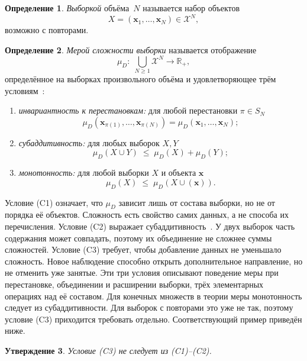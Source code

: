 \documentclass[14pt, a4paper]{extarticle}
\theoremstyle{definition}
\newtheorem{definition}{Определение}[section]
\theoremstyle{plain}
\newtheorem{proposition}[definition]{Утверждение}
\begin{document}
\begin{definition}
\label{def:sample}
\emph{Выборкой} объёма~$N$ называется набор объектов
\[
    X = (\mathbf{x}_1, \dots, \mathbf{x}_N) \in \mathcal{X}^N,
\]
возможно с повторами.
\end{definition}


\begin{definition}
\label{def:complexity}
\emph{Мерой сложности выборки} называется отображение
\[
    \mu_D:\; \bigcup_{N\ge1}\mathcal{X}^N \to \mathbb{R}_+,
\]
определённое на выборках произвольного объёма и удовлетворяющее трём
условиям~\cite{Grabovoy2025Thesis}:
\begin{enumerate}
    \item[(C1)] \emph{инвариантность к перестановкам:} для любой перестановки
          $\pi \in S_N$
          \[
              \mu_D(\mathbf{x}_{\pi(1)}, \dots, \mathbf{x}_{\pi(N)})
              = \mu_D(\mathbf{x}_1, \dots, \mathbf{x}_N);
          \]
    \item[(C2)] \emph{субаддитивность:} для любых выборок $X, Y$
          \[
              \mu_D(X \cup Y) \;\le\; \mu_D(X) + \mu_D(Y);
          \]
    \item[(C3)] \emph{монотонность:} для любой выборки $X$ и объекта $\mathbf{x}$
          \[
              \mu_D(X) \;\le\; \mu_D(X \cup (\mathbf{x})).
          \]
\end{enumerate}
\end{definition}

Условие (C1) означает, что $\mu_D$ зависит лишь от состава выборки, но не от
порядка её объектов. Сложность есть свойство самих данных, а не способа их
перечисления. Условие (C2) выражает субаддитивность~\cite{Grabovoy2025Thesis}. У
двух выборок часть содержания может совпадать, поэтому их объединение не сложнее
суммы сложностей. Условие (C3) требует, чтобы добавление данных не уменьшало
сложность. Новое наблюдение способно открыть дополнительное направление, но не
отменить уже занятые. Эти три условия описывают поведение меры при перестановке,
объединении и расширении выборки, трёх элементарных операциях над её составом. Для
конечных множеств в теории меры монотонность следует из субаддитивности. Для
выборок с повторами это уже не так, поэтому условие (C3) приходится требовать
отдельно. Соответствующий пример приведён ниже.

\begin{proposition}
\label{prop:c3-independent}
Условие (C3) не следует из (C1)--(C2).
\end{proposition}
\end{document}
